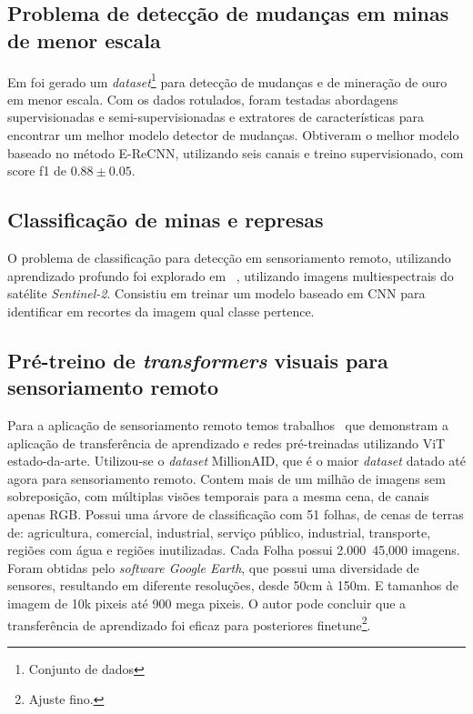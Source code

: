 \subsection{Problema de detecção de mudanças em minas de menor escala}\label{sec:Cap2_deteccao_mudanca}

Em \cite{rs14071746} foi gerado um \textit{dataset}\footnote{Conjunto de dados} para detecção de mudanças e de mineração de ouro em menor escala. Com os dados rotulados, foram testadas abordagens supervisionadas e semi-supervisionadas e extratores de características para encontrar um melhor modelo detector de mudanças. Obtiveram o melhor modelo baseado no método E-ReCNN, utilizando seis canais e treino supervisionado, com score f1 de $0.88\pm0.05$.

\subsection{Classificação de minas e represas}\label{sec:Cap2_minas_represa_classificacao}

O problema de classificação para detecção em sensoriamento remoto, utilizando aprendizado profundo foi explorado em ~\cite{s20236936}, utilizando imagens multiespectrais do satélite \textit{Sentinel-2}. Consistiu em treinar um modelo baseado em CNN para identificar em recortes da imagem qual classe pertence.

\subsection{Pré-treino de \textit{transformers} visuais para sensoriamento remoto}\label{sec:Cap2_million}

Para a aplicação de sensoriamento remoto temos trabalhos~\cite{wang2022empirical} que demonstram a aplicação de transferência de aprendizado e redes pré-treinadas utilizando ViT estado-da-arte. Utilizou-se o \textit{dataset} MillionAID, que é o maior \textit{dataset} datado até agora para sensoriamento remoto. Contem mais de um milhão de imagens sem sobreposição, com múltiplas visões temporais para a mesma cena, de canais apenas RGB. Possui uma árvore de classificação com 51 folhas, de cenas de terras de: agricultura, comercial, industrial, serviço público, industrial, transporte, regiões com água e regiões inutilizadas. Cada Folha possui 2.000~45,000 imagens. Foram obtidas pelo \textit{software Google Earth}, que possui uma diversidade de sensores, resultando em diferente resoluções, desde 50cm à 150m. E tamanhos de imagem de 10k pixeis até 900 mega pixeis.
O autor pode concluir que a transferência de aprendizado foi eficaz para posteriores finetune\footnote{Ajuste fino.}.

